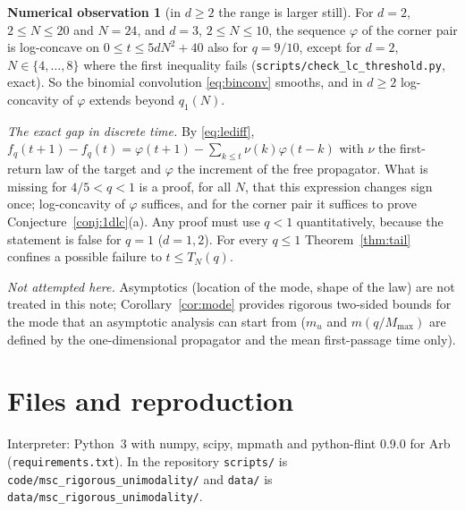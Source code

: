 \documentclass[11pt,a4paper]{article}
\theoremstyle{definition}
\newtheorem{observation}[theorem]{Numerical observation}
\begin{document}
\begin{observation}[in $d\ge2$ the range is larger still]\label{obs:larger}
For $d=2$, $2\le N\le20$ and $N=24$, and $d=3$, $2\le N\le10$, the sequence $\varphi$ of the corner pair is log-concave on $0\le t\le5dN^2+40$ also for $q=9/10$, except for $d=2$, $N\in\{4,\dots,8\}$ where the first inequality fails (\texttt{scripts/check\_lc\_threshold.py}, exact). So the binomial convolution \eqref{eq:binconv} smooths, and in $d\ge2$ log-concavity of $\varphi$ extends beyond $q_1(N)$.
\end{observation}

\emph{The exact gap in discrete time.} By \eqref{eq:lediff}, $f_q(t+1)-f_q(t)=\varphi(t+1)-\sum_{k\le t}\nu(k)\varphi(t-k)$ with $\nu$ the first-return law of the target and $\varphi$ the increment of the free propagator. What is missing for $4/5<q<1$ is a proof, for all $N$, that this expression changes sign once; log-concavity of $\varphi$ suffices, and for the corner pair it suffices to prove Conjecture~\ref{conj:1dlc}(a). Any proof must use $q<1$ quantitatively, because the statement is false for $q=1$ ($d=1,2$). For every $q\le1$ Theorem~\ref{thm:tail} confines a possible failure to $t\le T_N(q)$.

\emph{Not attempted here.} Asymptotics (location of the mode, shape of the law) are not treated in this note; Corollary~\ref{cor:mode} provides rigorous two-sided bounds for the mode that an asymptotic analysis can start from ($m_u$ and $m(q/M_{\max})$ are defined by the one-dimensional propagator and the mean first-passage time only).

\appendix
\section{Files and reproduction}\label{app:files}
Interpreter: Python~3 with numpy, scipy, mpmath and python-flint 0.9.0 for Arb (\texttt{requirements.txt}). In the repository \texttt{scripts/} is \texttt{code/msc\_rigorous\_unimodality/} and \texttt{data/} is \texttt{data/msc\_rigorous\_unimodality/}.
\end{document}

